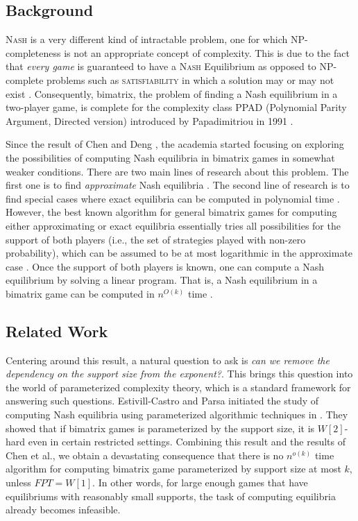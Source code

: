 \documentclass{article}
\begin{document}
\subsection*{Background}
\textsc{Nash} is a very different kind of intractable problem, one for which NP-completeness is not an appropriate concept of complexity. This is due to the fact that \emph{every game} is guaranteed to have a \textsc{Nash} Equilibrium as opposed to NP-complete problems such as \textsc{satisfiability} in which a solution may or may not exist \cite{nisan2007algorithmic}. Consequently, bimatrix, the problem of finding a Nash equilibrium in a two-player game, is complete for the complexity class PPAD (Polynomial Parity Argument, Directed version) introduced by Papadimitriou in 1991 \cite{chen2009settling,daskalakis2009complexity}.

Since the result of Chen and Deng \cite{chen2006settling}, the academia started focusing on exploring the possibilities of computing Nash equilibria in bimatrix games in somewhat weaker conditions. There are two main lines of research about this problem. The first one is to find \textit{approximate} Nash equilibria \cite{bosse2007new,chen2006computing,chen2006sparse,chen2007approximation,daskalakis2007progress,daskalakis2006note,lipton2003playing}. The second line of research is to find special cases where exact equilibria can be computed in polynomial time \cite{lipton2003playing,addario2007polynomial,chen2006sparse,codenotti2006efficient,kalyanaraman2007algorithms}.
However, the best known algorithm for general bimatrix games for computing either approximating or exact equilibria essentially tries all possibilities for the support of both players (i.e., the set of strategies played with non-zero probability), which can be assumed to be at most logarithmic in the approximate case \cite{lipton2003playing}. Once the support of both players is known, one can compute a Nash equilibrium by solving a linear program. That is, a Nash equilibrium in a bimatrix game can be computed in \(n^{O(k)}\) time \cite{nisan2007algorithmic}.


\subsection*{Related Work}
Centering around this result, a natural question to ask is \textit{can we remove the dependency on the support size from the exponent?}. This brings this question into the world of parameterized complexity theory, which is a standard framework for answering such questions. Estivill-Castro and Parsa initiated the study of computing Nash equilibria using parameterized algorithmic techniques in \cite{estivill2009computing}. They showed that if bimatrix games is parameterized by the support size, it is \(W[2]\)-hard even in certain restricted settings. Combining this result and the results of Chen et al.\cite{chen2004tight}, we obtain a devastating consequence that there is no \(n^{o(k)}\) time algorithm for computing bimatrix game parameterized by support size at most \(k\), unless \(FPT=W[1]\). In other words, for large enough games that have equilibriums with reasonably small supports, the task of computing equilibria already becomes infeasible. 
\end{document}

